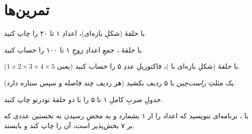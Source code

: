\section{تمرین‌ها}

\exercise با حلقهٔ  (شکلِ بازه‌ای)، اعدادِ ۱ تا ۲۰ را چاپ کنید.

\exercise با حلقهٔ ، جمعِ اعدادِ زوجِ ۱ تا ۱۰۰ را حساب کنید.

\exercise با حلقهٔ  (شکلِ بازه‌ای با )، فاکتوریلِ عددِ
۵ را حساب کنید (یعنی $1\times2\times3\times4\times5$).

\exercise یک مثلثِ \emph{راست‌چین} با ۵ ردیف بکشید (هر ردیف چند فاصله و سپس
ستاره دارد).

\exercise جدولِ ضربِ کاملِ ۱ تا ۵ را با دو حلقهٔ تودرتو چاپ کنید.

\exercise با ، برنامه‌ای بنویسید که اعداد را از ۱ بشمارد و به محضِ
رسیدن به نخستین عددی که بر ۷ بخش‌پذیر است، آن را چاپ کند و بایستد.
